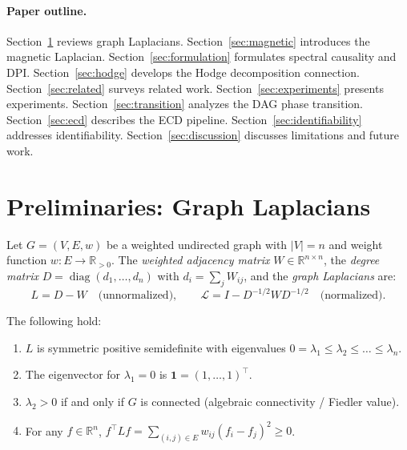 \documentclass[twoside,11pt]{article}
\DeclareMathOperator{\diag}{diag}
\newcommand{\R}{\mathbb{R}}
\newcommand{\bone}{\mathbf{1}}
\begin{document}
\paragraph{Paper outline.}
Section~\ref{sec:prelim} reviews graph Laplacians.
Section~\ref{sec:magnetic} introduces the magnetic Laplacian.
Section~\ref{sec:formulation} formulates spectral causality and DPI.
Section~\ref{sec:hodge} develops the Hodge decomposition connection.
Section~\ref{sec:related} surveys related work.
Section~\ref{sec:experiments} presents experiments.
Section~\ref{sec:transition} analyzes the DAG phase transition.
Section~\ref{sec:ecd} describes the ECD pipeline.
Section~\ref{sec:identifiability} addresses identifiability.
Section~\ref{sec:discussion} discusses limitations and future work.

\section{Preliminaries: Graph Laplacians}
\label{sec:prelim}

\begin{definition}
\label{def:laplacian}
Let $G=(V,E,w)$ be a weighted undirected graph with $|V|=n$ and weight
function $w:E\to\R_{>0}$.  The \emph{weighted adjacency matrix}
$W\in\R^{n\times n}$, the \emph{degree matrix}
$D=\diag(d_1,\dots,d_n)$ with $d_i=\sum_j W_{ij}$, and the
\emph{graph Laplacians} are:
\[
  L = D - W \quad\text{(unnormalized)}, \qquad
  \mathcal{L} = I - D^{-1/2}WD^{-1/2} \quad\text{(normalized)}.
\]
\end{definition}

\begin{proposition}
\label{prop:laplacian-basic}
The following hold:
\begin{enumerate}
\item[\emph{(i)}] $L$ is symmetric positive semidefinite with eigenvalues
  $0=\lambda_1\le\lambda_2\le\dots\le\lambda_n$.
\item[\emph{(ii)}] The eigenvector for $\lambda_1=0$ is
  $\bone=(1,\dots,1)^\top$.
\item[\emph{(iii)}] $\lambda_2>0$ if and only if $G$ is connected
  (algebraic connectivity / Fiedler value).
\item[\emph{(iv)}] For any $f\in\R^n$,
  $f^\top Lf = \sum_{(i,j)\in E}w_{ij}(f_i-f_j)^2 \ge 0$.
\end{enumerate}
\end{proposition}
\end{document}
